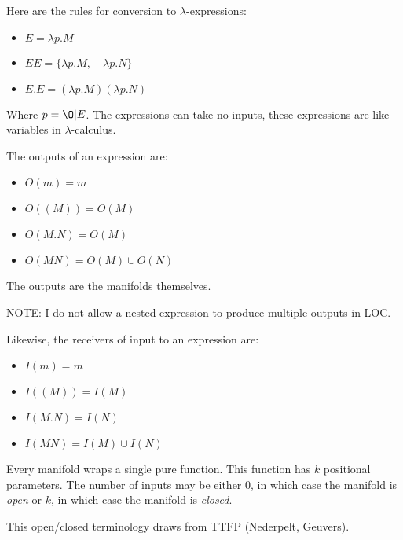 \documentclass[12pt]{article}
\begin{document}
Here are the rules for conversion to $\lambda$-expressions:

\begin{itemize}
  \item $E = \lambda p . M$
  \item $EE = \{ \lambda p . M, \quad \lambda p . N \}$
  \item $E.E = ( \lambda p . M ) ( \lambda p . N )$
\end{itemize}

Where $p = \O | E$. The expressions can take no inputs, these expressions are
like variables in $\lambda$-calculus.

The outputs of an expression are:

\begin{itemize}
  \item $O(m) = m$
  \item $O( (M) ) = O(M)$
  \item $O(M.N) = O(M)$
  \item $O(MN) = O(M) \cup O(N)$
\end{itemize}

The outputs are the manifolds themselves.

NOTE: I do not allow a nested expression to produce multiple outputs in LOC.

Likewise, the receivers of input to an expression are:

\begin{itemize}
  \item $I(m) = m$
  \item $I( (M) ) = I(M)$
  \item $I(M.N) = I(N)$
  \item $I(MN) = I(M) \cup I(N)$
\end{itemize}

Every manifold wraps a single pure function. This function has $k$ positional
parameters. The number of inputs may be either 0, in which case the manifold is
\textit{open} or $k$, in which case the manifold is \textit{closed}.

This open/closed terminology draws from TTFP (Nederpelt, Geuvers).
\end{document}
